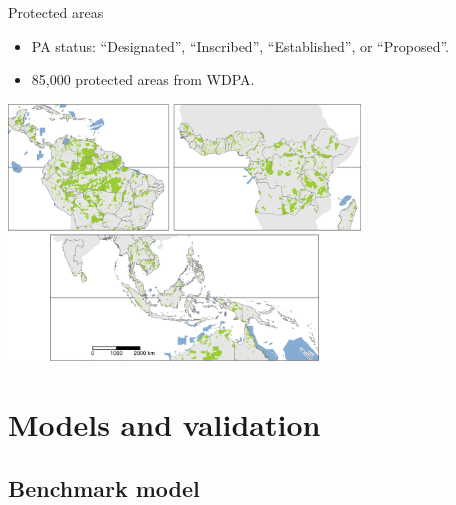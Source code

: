 \documentclass[10pt,table,dvipsnames,compress]{beamer}
\begin{document}
\begin{frame}[label={sec:org11e2e7c}]{Protected areas}
\begin{itemize}
\item PA status: ``Designated'', ``Inscribed'', ``Established'', or ``Proposed''.
\item 85,000 protected areas from WDPA.
\end{itemize}

\begin{center}
\includegraphics[width=0.7\textwidth]{figs/sm/pa.png}
\end{center}
\end{frame}

\section{Models and validation}
\label{sec:orgb92fcc6}

\subsection{Benchmark model}
\label{sec:org6ebc96a}
\end{document}
